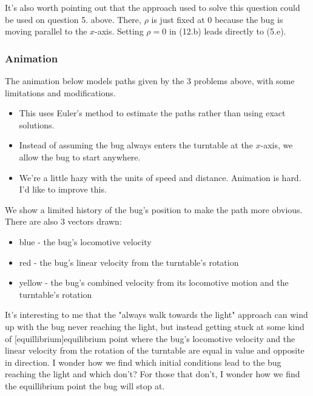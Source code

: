 \documentclass{article}
\begin{document}
It's also worth pointing out that the approach used to solve this question could be used on question 5. above. There, $\rho$ is just fixed at 0 because the bug is moving parallel to the $x$-axis. Setting $\rho = 0$ in (12.b) leads directly to (5.e).

\subsubsection{Animation}

The animation below models paths given by the 3 problems above, with some limitations and modifications.

\begin{itemize}
\item This uses Euler's method to estimate the paths rather than using exact solutions.
\item Instead of assuming the bug always enters the turntable at the $x$-axis, we allow the bug to start anywhere.
\item We're a little hazy with the units of speed and distance. Animation is hard. I'd like to improve this.
\end{itemize}

We show a limited history of the bug's position to make the path more obvious. There are also 3 \@{vectors} drawn:

\begin{itemize}
\item blue - the bug's locomotive velocity
\item red - the bug's linear velocity from the turntable's rotation
\item yellow - the bug's combined velocity from its locomotive motion and the turntable's rotation
\end{itemize}


It's interesting to me that the "always walk towards the light" approach can wind up with the bug never reaching the light, but instead getting stuck at some kind of \@[equillibrium]{equilibrium} point where the bug's locomotive velocity and the linear velocity from the rotation of the turntable are equal in value and opposite in direction. I wonder how we find which initial conditions lead to the bug reaching the light and which don't? For those that don't, I wonder how we find the equillibrium point the bug will stop at.
\end{document}

